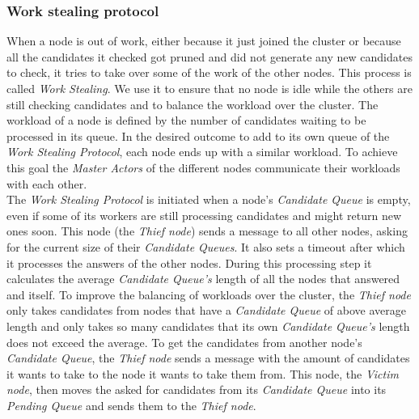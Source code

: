 \subsubsection{Work stealing protocol}\label{protocol:workStealing}
When a node is out of work, either because it just joined the cluster or because all the candidates it checked got pruned and did not generate any new candidates to check, it tries to take over some of the work of the other nodes. 
This process is called \emph{Work Stealing}.
We use it to ensure that no node is idle while the others are still checking candidates and to balance the workload over the cluster. 
The workload of a node is defined by the number of candidates waiting to be processed in its queue. 
In the desired outcome to add to its own queue of the \emph{Work Stealing Protocol}, each node ends up with a similar workload. 
To achieve this goal the \emph{Master Actors} of the different nodes communicate their workloads with each other.\\
The \emph{Work Stealing Protocol} is initiated when a node's \emph{Candidate Queue} is empty, even if some of its workers are still processing candidates and might return new ones soon.
This node (the \emph{Thief node}) sends a message to all other nodes, asking for the current size of their \emph{Candidate Queues}.
It also sets a timeout after which it processes the answers of the other nodes. 
During this processing step it calculates the average \emph{Candidate Queue's} length of all the nodes that answered and itself.
To improve the balancing of workloads over the cluster, the \emph{Thief node} only takes candidates from nodes that have a \emph{Candidate Queue} of above average length and only takes so many candidates that its own \emph{Candidate Queue's} length does not exceed the average. 
To get the candidates from another node's \emph{Candidate Queue}, the \emph{Thief node} sends a message with the amount of candidates it wants to take to the node it wants to take them from.
This node, the \emph{Victim node}, then moves the asked for candidates from its \emph{Candidate Queue} into its \emph{Pending Queue} and sends them to the \emph{Thief node}.
